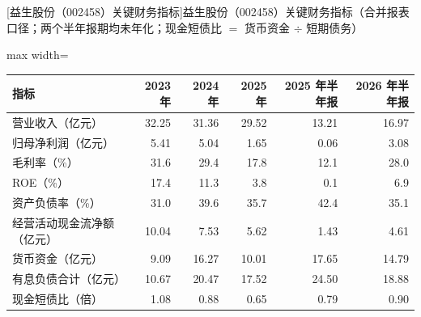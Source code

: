 \begin{center}\small\setlength{\tabcolsep}{3.4pt}
[益生股份（002458）关键财务指标]{益生股份（002458）关键财务指标（合并报表口径；两个半年报期均未年化；现金短债比 $=$ 货币资金 $\div$ 短期债务）}
\begin{adjustbox}{max width=\textwidth}
\begin{tabular}{@{}lrrrrr@{}}
\toprule
指标 & 2023 年 & 2024 年 & 2025 年 & 2025 年半年报 & 2026 年半年报 \\
\midrule
营业收入（亿元） & 32.25 & 31.36 & 29.52 & 13.21 & 16.97 \\
归母净利润（亿元） & 5.41 & 5.04 & 1.65 & 0.06 & 3.08 \\
毛利率（\%） & 31.6 & 29.4 & 17.8 & 12.1 & 28.0 \\
ROE（\%） & 17.4 & 11.3 & 3.8 & 0.1 & 6.9 \\
资产负债率（\%） & 31.0 & 39.6 & 35.7 & 42.4 & 35.1 \\
经营活动现金流净额（亿元） & 10.04 & 7.53 & 5.62 & 1.43 & 4.61 \\
货币资金（亿元） & 9.09 & 16.27 & 10.01 & 17.65 & 14.79 \\
有息负债合计（亿元） & 10.67 & 20.47 & 17.52 & 24.50 & 18.88 \\
现金短债比（倍） & 1.08 & 0.88 & 0.65 & 0.79 & 0.90 \\
\bottomrule
\end{tabular}
\end{adjustbox}
\end{center}

